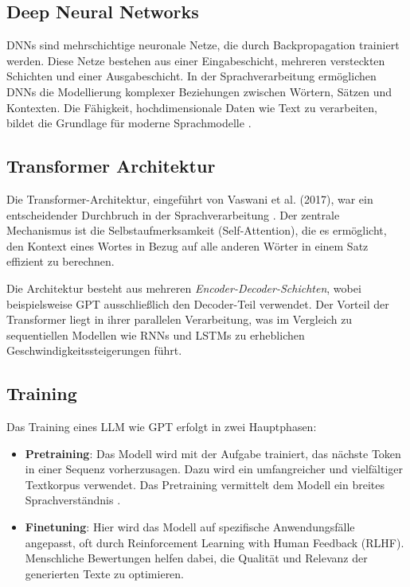 \documentclass[12pt]{article}
\begin{document}
\subsection{Deep Neural Networks}

DNNs sind mehrschichtige neuronale Netze, die durch Backpropagation trainiert werden. Diese Netze bestehen aus einer Eingabeschicht, mehreren versteckten Schichten und einer Ausgabeschicht. In der Sprachverarbeitung ermöglichen DNNs die Modellierung komplexer Beziehungen zwischen Wörtern, Sätzen und Kontexten. Die Fähigkeit, hochdimensionale Daten wie Text zu verarbeiten, bildet die Grundlage für moderne Sprachmodelle \cite{vaswani2017}.

\subsection{Transformer Architektur}

Die Transformer-Architektur, eingeführt von Vaswani et al. (2017), war ein entscheidender Durchbruch in der Sprachverarbeitung \cite{vaswani2017}. Der zentrale Mechanismus ist die Selbstaufmerksamkeit (Self-Attention), die es ermöglicht, den Kontext eines Wortes in Bezug auf alle anderen Wörter in einem Satz effizient zu berechnen. 

Die Architektur besteht aus mehreren \emph{Encoder-Decoder-Schichten}, wobei beispielsweise GPT ausschließlich den Decoder-Teil verwendet. Der Vorteil der Transformer liegt in ihrer parallelen Verarbeitung, was im Vergleich zu sequentiellen Modellen wie RNNs und LSTMs zu erheblichen Geschwindigkeitssteigerungen führt.

\subsection{Training}

Das Training eines LLM wie GPT erfolgt in zwei Hauptphasen:
\begin{itemize}
    \item \textbf{Pretraining}: Das Modell wird mit der Aufgabe trainiert, das nächste Token in einer Sequenz vorherzusagen. Dazu wird ein umfangreicher und vielfältiger Textkorpus verwendet. Das Pretraining vermittelt dem Modell ein breites Sprachverständnis \cite{brown2020}.
    \item \textbf{Finetuning}: Hier wird das Modell auf spezifische Anwendungsfälle angepasst, oft durch Reinforcement Learning with Human Feedback (RLHF). Menschliche Bewertungen helfen dabei, die Qualität und Relevanz der generierten Texte zu optimieren.
\end{itemize}
\end{document}
